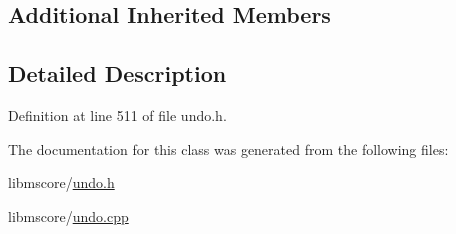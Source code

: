 \subsection*{Additional Inherited Members}


\subsection{Detailed Description}


Definition at line 511 of file undo.\+h.



The documentation for this class was generated from the following files\+:\begin{DoxyCompactItemize}
\item 
libmscore/\hyperlink{undo_8h}{undo.\+h}\item 
libmscore/\hyperlink{undo_8cpp}{undo.\+cpp}\end{DoxyCompactItemize}
